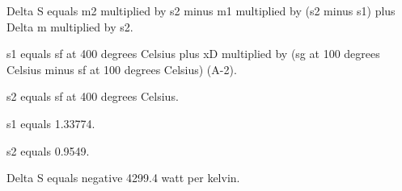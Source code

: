 Delta S equals m2 multiplied by s2 minus m1 multiplied by (s2 minus s1) plus Delta m multiplied by s2.  

s1 equals sf at 400 degrees Celsius plus xD multiplied by (sg at 100 degrees Celsius minus sf at 100 degrees Celsius) (A-2).  

s2 equals sf at 400 degrees Celsius.  

s1 equals 1.33774.  

s2 equals 0.9549.  

Delta S equals negative 4299.4 watt per kelvin.